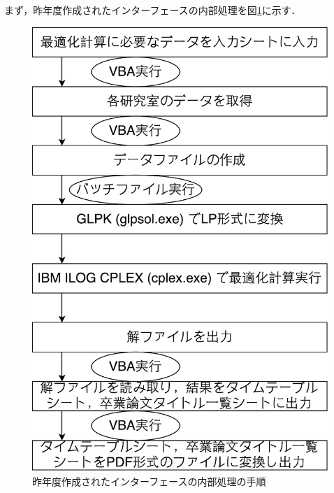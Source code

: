 \documentclass[a4paper,12pt,fleqn]{jarticle}
\begin{document}
まず，昨年度作成されたインターフェースの内部処理を図\ref{fig:wakac}に示す．
\begin{figure}[H]
  \begin{center}
    \includegraphics[scale=1.0]{fig_FlowChart.pdf}
    \caption{昨年度作成されたインターフェースの内部処理の手順}
    \label{fig:wakac}
  \end{center}
\end{figure}
\end{document}
